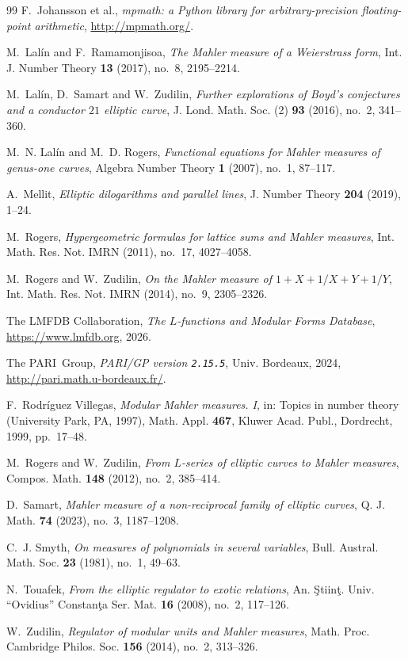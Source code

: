 \documentclass[preprint,12pt]{elsarticle}
\theoremstyle{definition}
\theoremstyle{remark}
\begin{document}
\begin{thebibliography}{99}
F.~Johansson et al.,
\emph{mpmath: a Python library for arbitrary-precision floating-point
arithmetic}, \url{http://mpmath.org/}.

M.~Lal\'in and F.~Ramamonjisoa,
\emph{The Mahler measure of a Weierstrass form},
Int. J. Number Theory \textbf{13} (2017), no.~8, 2195--2214.

M.~Lal\'in, D.~Samart and W.~Zudilin,
\emph{Further explorations of Boyd's conjectures and a conductor $21$
elliptic curve},
J. Lond. Math. Soc. (2) \textbf{93} (2016), no.~2, 341--360.

M.~N. Lal\'in and M.~D. Rogers,
\emph{Functional equations for Mahler measures of genus-one curves},
Algebra Number Theory \textbf{1} (2007), no.~1, 87--117.

A.~Mellit,
\emph{Elliptic dilogarithms and parallel lines},
J. Number Theory \textbf{204} (2019), 1--24.

M.~Rogers,
\emph{Hypergeometric formulas for lattice sums and Mahler measures},
Int. Math. Res. Not. IMRN (2011), no.~17, 4027--4058.

M.~Rogers and W.~Zudilin,
\emph{On the Mahler measure of $1+X+1/X+Y+1/Y$},
Int. Math. Res. Not. IMRN (2014), no.~9, 2305--2326.

The LMFDB Collaboration,
\emph{The $L$-functions and Modular Forms Database},
\url{https://www.lmfdb.org}, 2026.

The PARI~Group,
\emph{PARI/GP version \texttt{2.15.5}},
Univ. Bordeaux, 2024, \url{http://pari.math.u-bordeaux.fr/}.

F.~Rodr\'iguez Villegas,
\emph{Modular Mahler measures. I},
in: Topics in number theory (University Park, PA, 1997),
Math. Appl. \textbf{467}, Kluwer Acad. Publ., Dordrecht, 1999, pp.~17--48.

M.~Rogers and W.~Zudilin,
\emph{From $L$-series of elliptic curves to Mahler measures},
Compos. Math. \textbf{148} (2012), no.~2, 385--414.

D.~Samart,
\emph{Mahler measure of a non-reciprocal family of elliptic curves},
Q. J. Math. \textbf{74} (2023), no.~3, 1187--1208.

C.~J. Smyth,
\emph{On measures of polynomials in several variables},
Bull. Austral. Math. Soc. \textbf{23} (1981), no.~1, 49--63.

N.~Touafek,
\emph{From the elliptic regulator to exotic relations},
An. \c Stiin\c t. Univ. ``Ovidius'' Constan\c ta Ser. Mat. \textbf{16}
(2008), no.~2, 117--126.

W.~Zudilin,
\emph{Regulator of modular units and Mahler measures},
Math. Proc. Cambridge Philos. Soc. \textbf{156} (2014), no.~2, 313--326.

\end{thebibliography}
\end{document}
